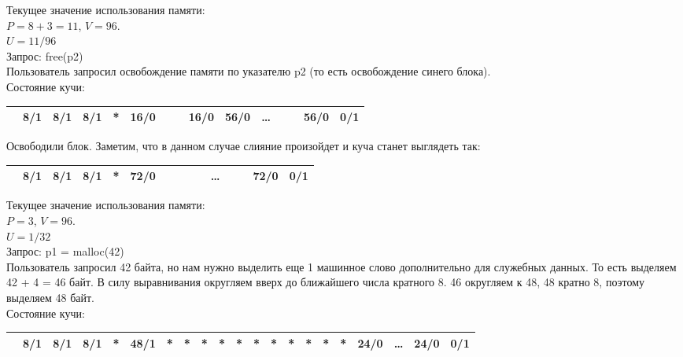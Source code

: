 \documentclass[12pt, letterpaper]{article}
\begin{document}
Текущее значение использования памяти:\\
$P=8 + 3 = 11$, $V=96$.\\ 
$U=11/96$\\

Запрос: free(p2)\\
Пользователь запросил освобождение памяти по указателю p2 (то есть освобождение синего блока).\\

Состояние кучи:
\begin{center}
    \begin{tabular}{|c|c|c|c|c|c|c|c|c|c|c|c|c|c|c|}
        \hline
         \cellcolor{black} & \cellcolor[gray]{0.9} 8/1 & \cellcolor[gray]{0.9} 8/1 &\cellcolor{red!=40}8/1 &\cellcolor{red!=40}*&16/0 & & &16/0 &56/0& \dots & & & 56/0 & 0/1 \\
        \hline
    \end{tabular}
\end{center}
Освободили блок. Заметим, что в данном случае слияние произойдет и куча станет выглядеть так:
\begin{center}
    \begin{tabular}{|c|c|c|c|c|c|c|c|c|c|c|c|c|c|c|}
        \hline
         \cellcolor{black} & \cellcolor[gray]{0.9} 8/1 & \cellcolor[gray]{0.9} 8/1 &\cellcolor{red!=40}8/1 &\cellcolor{red!=40}*&72/0 & & & & & \dots & & & 72/0 & 0/1 \\
        \hline
    \end{tabular}
\end{center}

Текущее значение использования памяти:\\
$P=3$, $V=96$.\\ 
$U=1/32$\\

Запрос: p1 = malloc(42)\\
Пользователь запросил 42 байта, но нам нужно выделить еще 1 машинное слово дополнительно для служебных данных. То есть выделяем 42 + 4 = 46 байт. В силу выравнивания округляем вверх до ближайшего числа кратного 8. 46 округляем к 48, 48 кратно 8, поэтому выделяем 48 байт.\\
Состояние кучи:
\begin{center}
    \begin{tabular}{|c|c|c|c|c|c|c|c|c|c|c|c|c|c|c|c|c|c|c|c|c|}
        \hline
         \cellcolor{black} & \cellcolor[gray]{0.9} 8/1 & \cellcolor[gray]{0.9} 8/1 &\cellcolor{red!=40}8/1 &\cellcolor{red!=40}*&\cellcolor{green!=40}48/1 &\cellcolor{green!=40}*&\cellcolor{green!=40}*&\cellcolor{green!=40}*&\cellcolor{green!=40}*&\cellcolor{green!=40}*&\cellcolor{green!=40}*&\cellcolor{green!=40}*&\cellcolor{green!=40}*&\cellcolor{green!=40}*&\cellcolor{green!=40}*&\cellcolor{green!=40}*& 24/0 &\dots & 24/0 & 0/1 \\
        \hline
    \end{tabular}
\end{center}
\end{document}
